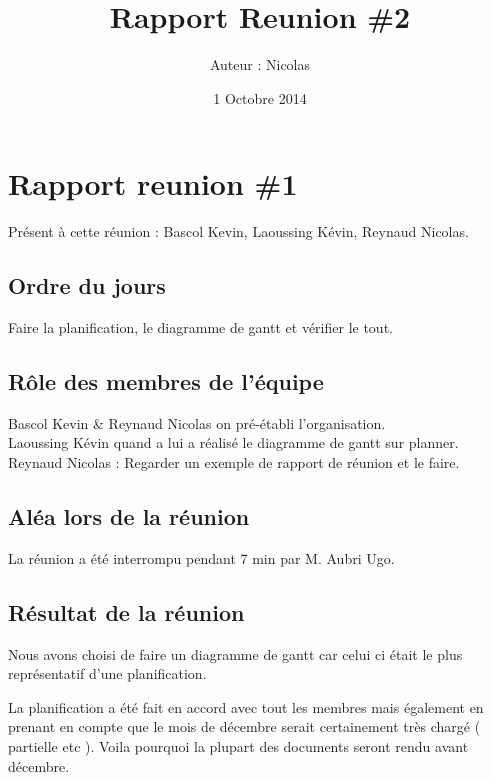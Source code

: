 \documentclass{article}
\title{Rapport Reunion \#2}
\author{Auteur : Nicolas \bsc{Reynaud}}
\date{1 Octobre 2014}
\begin{document}
\maketitle
\newpage

\renewcommand{\contentsname}{Sommaire}
\tableofcontents
\newpage

\section{Rapport reunion \#1}

Présent à cette réunion : Bascol Kevin, Laoussing Kévin, Reynaud Nicolas.

\subsection{Ordre du jours}
Faire la planification, le diagramme de gantt et vérifier le tout.\\

\subsection{Rôle des membres de l'équipe}

Bascol Kevin \& Reynaud Nicolas on pré-établi l'organisation.\\
\indent Laoussing Kévin quand a lui a réalisé le diagramme de gantt sur planner.\\
\indent Reynaud Nicolas : Regarder un exemple de rapport de réunion et le faire.\\

\subsection{Aléa lors de la réunion}

La réunion a été interrompu pendant 7 min par M. Aubri Ugo. \\

\subsection{Résultat de la réunion}

Nous avons choisi de faire un diagramme de gantt car celui ci était le plus représentatif d'une planification.

La planification a été fait en accord avec tout les membres mais également en prenant en compte que le mois de décembre serait certainement très chargé ( partielle etc ). Voila pourquoi la plupart des documents seront rendu avant décembre.\\
\end{document}
